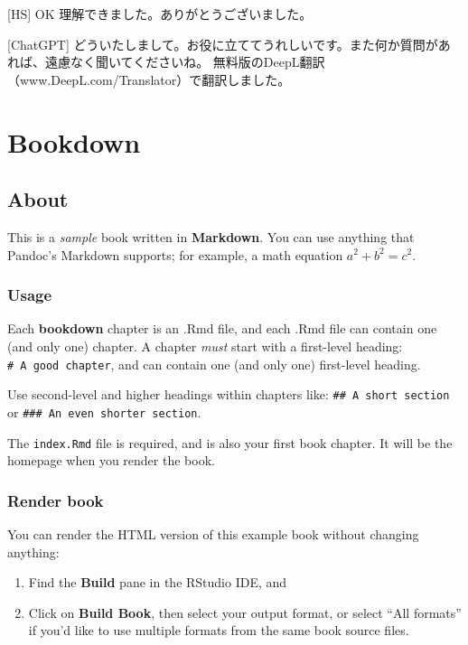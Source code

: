 \documentclass[
]{bxjsbook}
\theoremstyle{definition}
\theoremstyle{definition}
\theoremstyle{definition}
\theoremstyle{definition}
\theoremstyle{remark}
\begin{document}
{[}HS{]} OK 理解できました。ありがとうございました。

{[}ChatGPT{]} どういたしまして。お役に立ててうれしいです。また何か質問があれば、遠慮なく聞いてくださいね。 無料版のDeepL翻訳（www.DeepL.com/Translator）で翻訳しました。

\hypertarget{bookdown}{%
\section{Bookdown}\label{bookdown}}

\hypertarget{about}{%
\subsection{About}\label{about}}

This is a \emph{sample} book written in \textbf{Markdown}. You can use anything that Pandoc's Markdown supports; for example, a math equation \(a^2 + b^2 = c^2\).

\hypertarget{usage}{%
\subsubsection{Usage}\label{usage}}

Each \textbf{bookdown} chapter is an .Rmd file, and each .Rmd file can contain one (and only one) chapter. A chapter \emph{must} start with a first-level heading: \texttt{\#\ A\ good\ chapter}, and can contain one (and only one) first-level heading.

Use second-level and higher headings within chapters like: \texttt{\#\#\ A\ short\ section} or \texttt{\#\#\#\ An\ even\ shorter\ section}.

The \texttt{index.Rmd} file is required, and is also your first book chapter. It will be the homepage when you render the book.

\hypertarget{render-book}{%
\subsubsection{Render book}\label{render-book}}

You can render the HTML version of this example book without changing anything:

\begin{enumerate}
\def\labelenumi{\arabic{enumi}.}
\item
  Find the \textbf{Build} pane in the RStudio IDE, and
\item
  Click on \textbf{Build Book}, then select your output format, or select ``All formats'' if you'd like to use multiple formats from the same book source files.
\end{enumerate}
\end{document}
